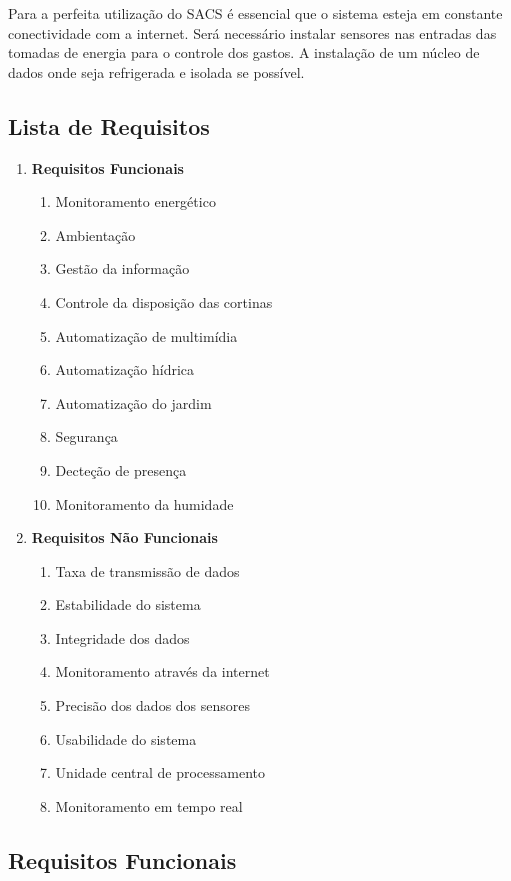 	Para a perfeita utilização do SACS é essencial que o sistema esteja em constante conectividade com a internet.
	Será necessário instalar sensores nas entradas das tomadas de energia para o controle dos gastos. A instalação
	de um núcleo de dados onde seja refrigerada e isolada se possível.

\subsection{Lista de Requisitos}
\begin{enumerate} %
	\item \textbf{Requisitos Funcionais}
	\begin{enumerate} %
		\item Monitoramento energético
		\item Ambientação
		\item Gestão da informação
		\item Controle da disposição das cortinas
		\item Automatização de multimídia
		\item Automatização hídrica
		\item Automatização do jardim
		\item Segurança
		\item Decteção de presença
		\item Monitoramento da humidade
	\end{enumerate}

	\item \textbf{Requisitos Não Funcionais}
	\begin{enumerate} %
		\item Taxa de transmissão de dados
		\item Estabilidade do sistema
		\item Integridade dos dados
		\item Monitoramento através da internet
		\item Precisão dos dados dos sensores
		\item Usabilidade do sistema
		\item Unidade central de processamento
		\item Monitoramento em tempo real
	\end{enumerate}
\end{enumerate}

\subsection{Requisitos Funcionais}
